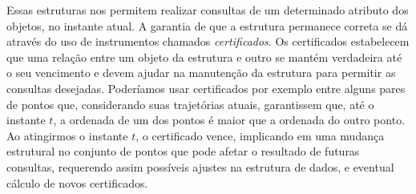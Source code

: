 Essas estruturas nos permitem realizar consultas de um determinado
atributo dos objetos, no instante atual. A garantia de que a
estrutura permanece correta se dá através do uso de instrumentos
chamados \textit{certificados}. Os certificados estabelecem que uma
relação entre um objeto da estrutura e outro se mantém verdadeira
até o seu vencimento e devem ajudar na manutenção da estrutura para
permitir as consultas desejadas. Poderíamos usar certificados por
exemplo entre alguns pares de pontos que, considerando suas
trajetórias atuais, garantissem que, até o instante $t$, a ordenada
de um dos pontos é maior que a ordenada do outro ponto. Ao
atingirmos o instante $t$, o certificado vence, implicando em uma
mudança estrutural no conjunto de pontos que pode afetar o resultado
de futuras consultas, requerendo assim possíveis ajustes na
estrutura de dados, e eventual cálculo de novos certificados.
